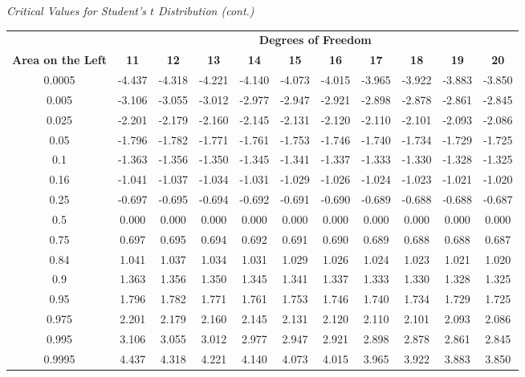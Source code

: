                 \newpage
                {\Large \emph{Critical Values for Student's $t$ Distribution (cont.)}}\\
        
\begin{center}
\begin{tabular}{ccccccccccc}
 & \multicolumn{10}{c}{\bf Degrees of Freedom} \\
{\bf Area on the Left} & {\bf 11} & {\bf 12} & {\bf 13} & {\bf 14} & {\bf 15} & {\bf 16} & {\bf 17} & {\bf 18} & {\bf 19} & {\bf 20}\\
0.0005 & -4.437 & -4.318 & -4.221 & -4.140 & -4.073 & -4.015 & -3.965 & -3.922 & -3.883 & -3.850\\
0.005 & -3.106 & -3.055 & -3.012 & -2.977 & -2.947 & -2.921 & -2.898 & -2.878 & -2.861 & -2.845\\
0.025 & -2.201 & -2.179 & -2.160 & -2.145 & -2.131 & -2.120 & -2.110 & -2.101 & -2.093 & -2.086\\
0.05 & -1.796 & -1.782 & -1.771 & -1.761 & -1.753 & -1.746 & -1.740 & -1.734 & -1.729 & -1.725\\
0.1 & -1.363 & -1.356 & -1.350 & -1.345 & -1.341 & -1.337 & -1.333 & -1.330 & -1.328 & -1.325\\
0.16 & -1.041 & -1.037 & -1.034 & -1.031 & -1.029 & -1.026 & -1.024 & -1.023 & -1.021 & -1.020\\
0.25 & -0.697 & -0.695 & -0.694 & -0.692 & -0.691 & -0.690 & -0.689 & -0.688 & -0.688 & -0.687\\
0.5 & 0.000 & 0.000 & 0.000 & 0.000 & 0.000 & 0.000 & 0.000 & 0.000 & 0.000 & 0.000\\
0.75 & 0.697 & 0.695 & 0.694 & 0.692 & 0.691 & 0.690 & 0.689 & 0.688 & 0.688 & 0.687\\
0.84 & 1.041 & 1.037 & 1.034 & 1.031 & 1.029 & 1.026 & 1.024 & 1.023 & 1.021 & 1.020\\
0.9 & 1.363 & 1.356 & 1.350 & 1.345 & 1.341 & 1.337 & 1.333 & 1.330 & 1.328 & 1.325\\
0.95 & 1.796 & 1.782 & 1.771 & 1.761 & 1.753 & 1.746 & 1.740 & 1.734 & 1.729 & 1.725\\
0.975 & 2.201 & 2.179 & 2.160 & 2.145 & 2.131 & 2.120 & 2.110 & 2.101 & 2.093 & 2.086\\
0.995 & 3.106 & 3.055 & 3.012 & 2.977 & 2.947 & 2.921 & 2.898 & 2.878 & 2.861 & 2.845\\
0.9995 & 4.437 & 4.318 & 4.221 & 4.140 & 4.073 & 4.015 & 3.965 & 3.922 & 3.883 & 3.850\\
\end{tabular}
\end{center}

